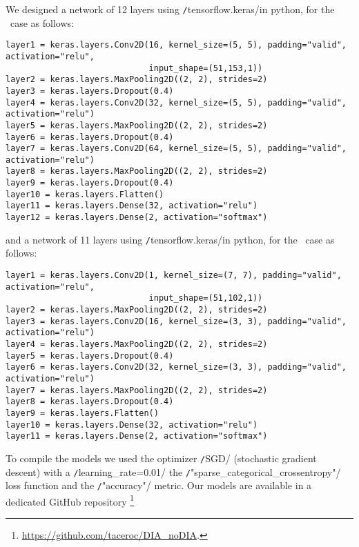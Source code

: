 



We designed a network of 12 layers using \texttt/tensorflow.keras/in python, for the \diabased\ case as follows:
\vspace{1cm}

\begin{verbatim}
layer1 = keras.layers.Conv2D(16, kernel_size=(5, 5), padding="valid", activation="relu", 
                             input_shape=(51,153,1))
layer2 = keras.layers.MaxPooling2D((2, 2), strides=2)
layer3 = keras.layers.Dropout(0.4)
layer4 = keras.layers.Conv2D(32, kernel_size=(5, 5), padding="valid", activation="relu")
layer5 = keras.layers.MaxPooling2D((2, 2), strides=2)
layer6 = keras.layers.Dropout(0.4)
layer7 = keras.layers.Conv2D(64, kernel_size=(5, 5), padding="valid", activation="relu")
layer8 = keras.layers.MaxPooling2D((2, 2), strides=2)
layer9 = keras.layers.Dropout(0.4)
layer10 = keras.layers.Flatten()
layer11 = keras.layers.Dense(32, activation="relu")
layer12 = keras.layers.Dense(2, activation="softmax")
\end{verbatim}
\FloatBarrier

\vspace{1cm}

\noindent and a network of 11 layers using  \texttt/tensorflow.keras/in python, for the \nodia\ case as follows:
\vspace{1cm}

\begin{verbatim}
layer1 = keras.layers.Conv2D(1, kernel_size=(7, 7), padding="valid", activation="relu", 
                             input_shape=(51,102,1))
layer2 = keras.layers.MaxPooling2D((2, 2), strides=2)
layer3 = keras.layers.Conv2D(16, kernel_size=(3, 3), padding="valid", activation="relu")
layer4 = keras.layers.MaxPooling2D((2, 2), strides=2)
layer5 = keras.layers.Dropout(0.4)
layer6 = keras.layers.Conv2D(32, kernel_size=(3, 3), padding="valid", activation="relu")
layer7 = keras.layers.MaxPooling2D((2, 2), strides=2)
layer8 = keras.layers.Dropout(0.4)
layer9 = keras.layers.Flatten()
layer10 = keras.layers.Dense(32, activation="relu")
layer11 = keras.layers.Dense(2, activation="softmax")
\end{verbatim}
To compile the models we used the optimizer \texttt/SGD/ (stochastic gradient descent) with a \texttt/learning_rate=0.01/ the \texttt/"sparse_categorical_crossentropy"/ loss function and the \texttt/"accuracy"/ metric. Our models are available in a dedicated GitHub repository \footnote{\url{https://github.com/taceroc/DIA_noDIA}.}
